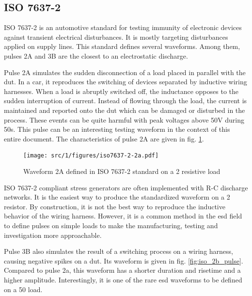 
\subsection{ISO 7637-2}

ISO 7637-2\cite{iso7637-2} is an automotive standard for testing immunity of electronic devices against transient electrical disturbances.
It is mostly targeting disturbances applied on supply lines.
This standard defines several waveforms.
Among them, pulses 2A and 3B are the closest to an electrostatic discharge.

Pulse 2A simulates the sudden disconnection of a load placed in parallel with the \gls{dut}.
In a car, it reproduces the switching of devices separated by inductive wiring harnesses.
When a load is abruptly switched off, the inductance opposes to the sudden interruption of current.
Instead of flowing through the load, the current is maintained and reported onto the \gls{dut} which can be damaged or disturbed in the process.
These events can be quite harmful with peak voltages above 50V during 50\textmu{}s.
This pulse can be an interesting testing waveform in the context of this entire document.
The characteristics of pulse 2A are given in fig. \ref{fig:iso_2a_pulse}.

\begin{figure}[!h]
  \centering
  \texttt{[image: src/1/figures/iso7637-2-2a.pdf]}
  \caption{Waveform 2A defined in ISO 7637-2 standard on a 2\textOmega{} resistive load}
  \label{fig:iso_2a_pulse}
\end{figure}

ISO 7637-2 compliant stress generators are often implemented with R-C discharge networks.
It is the easiest way to produce the standardized waveform on a 2\textOmega{} resistor.
By construction, it is not the best way to reproduce the inductive behavior of the wiring harness.
However, it is a common method in the \gls{esd} field to define pulses on simple loads to make the manufacturing, testing and investigation more approachable.

Pulse 3B also simulates the result of a switching process on a wiring harness, causing negative spikes on a \gls{dut}.
Its waveform is given in fig. \ref{fig:iso_2b_pulse}.
Compared to pulse 2a, this waveform has a shorter duration and risetime and a higher amplitude.
Interestingly, it is one of the rare \gls{esd} waveforms to be defined on a 50\textOmega{} load.

